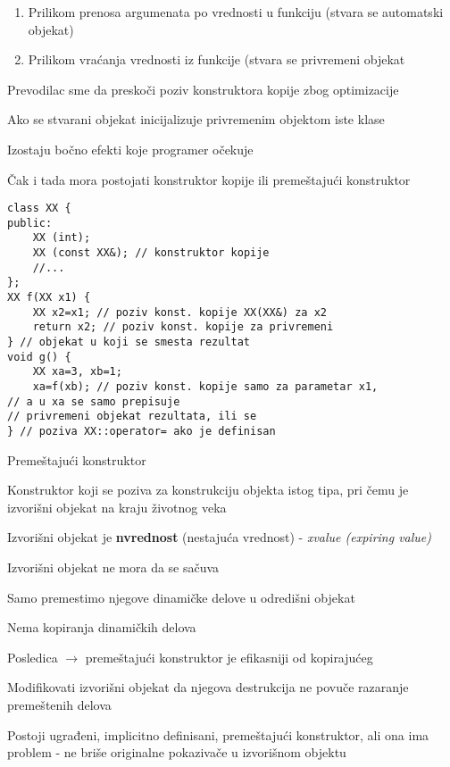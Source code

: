 \documentclass{article}
\newenvironment{xitemize}{%
    
    \itemize
    \larger
}{%
    \enditemize
}
\let\olditemize\itemize
\let\endolditemize\enditemize
\renewenvironment{itemize}{%
    \smaller
    \olditemize
}{%
    \endolditemize
}
\begin{document}
\begin{xitemize}
\begin{itemize}
\begin{enumerate}
        \item Prilikom prenosa argumenata po vrednosti u funkciju (stvara se automatski objekat)
        \item Prilikom vraćanja vrednosti iz funkcije (stvara se privremeni objekat
    \end{enumerate}
    \item Prevodilac sme da preskoči poziv konstruktora kopije zbog optimizacije
    \begin{itemize}
        \item[-] Ako se stvarani objekat inicijalizuje privremenim objektom iste klase
        \item[-] Izostaju bočno efekti koje programer očekuje
        \item[-] Čak i tada mora postojati konstruktor kopije ili premeštajući konstruktor
    \end{itemize}
    \begin{lstlisting}
class XX {
public:
    XX (int);
    XX (const XX&); // konstruktor kopije
    //...
};
XX f(XX x1) {
    XX x2=x1; // poziv konst. kopije XX(XX&) za x2
    return x2; // poziv konst. kopije za privremeni
} // objekat u koji se smesta rezultat
void g() {
    XX xa=3, xb=1;
    xa=f(xb); // poziv konst. kopije samo za parametar x1,
// a u xa se samo prepisuje
// privremeni objekat rezultata, ili se
} // poziva XX::operator= ako je definisan
    \end{lstlisting}
\end{itemize}
\newpage
\item Premeštajući konstruktor
\begin{itemize}
    \item Konstruktor koji se poziva za konstrukciju objekta istog tipa, pri čemu je izvorišni objekat na kraju životnog veka
    \item Izvorišni objekat je \textbf{nvrednost} (nestajuća vrednost) - \textit{xvalue (expiring value)}
    \item Izvorišni objekat ne mora da se sačuva
    \item Samo premestimo njegove dinamičke delove u odredišni objekat
    \item Nema kopiranja dinamičkih delova
    \item Posledica $\rightarrow$ premeštajući konstruktor je efikasniji od kopirajućeg
    \item Modifikovati izvorišni objekat da njegova destrukcija ne povuče razaranje premeštenih delova
    \item Postoji ugrađeni, implicitno definisani, premeštajući konstruktor, ali ona ima problem - ne briše originalne pokazivače u izvorišnom objektu

\end{itemize}
\end{xitemize}
\end{document}
